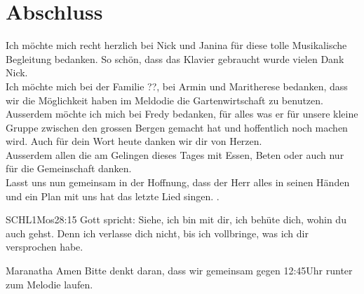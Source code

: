 \documentclass{../../inc/mybib}
\begin{document}







\section{Abschluss}

Ich möchte mich recht herzlich bei Nick und Janina für diese tolle Musikalische Begleitung bedanken. So schön, dass das Klavier gebraucht wurde vielen Dank Nick.\\
Ich möchte mich bei der Familie ??, bei Armin und Maritherese bedanken, dass wir die Möglichkeit haben im Meldodie die Gartenwirtschaft zu benutzen.\\
Ausserdem möchte ich mich bei Fredy bedanken, für alles was er für unsere kleine Gruppe zwischen den grossen Bergen gemacht hat und hoffentlich noch machen wird. Auch für dein Wort heute danken wir dir von Herzen.\\
Ausserdem allen die am Gelingen dieses Tages mit Essen, Beten oder auch nur für die Gemeinschaft danken.\\
Lasst uns nun gemeinsam in der Hoffnung, dass der Herr alles in seinen Händen und ein Plan mit uns hat das letzte Lied singen. .

\beten{}

\begin{bibelbox}{SCHL}{1Mos}{28:15}
    Gott spricht: Siehe, ich bin mit dir,
    ich behüte dich, wohin du auch gehst.
    Denn ich verlasse dich nicht,
    bis ich vollbringe, was ich dir versprochen habe.
\end{bibelbox}

Maranatha Amen
Bitte denkt daran, dass wir gemeinsam gegen 12:45Uhr runter zum Melodie laufen. 
\end{document}
